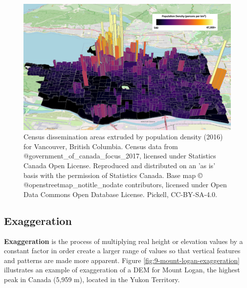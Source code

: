 \documentclass[
]{book}
\begin{document}
\begin{figure}
\includegraphics[width=0.75\linewidth]{images/09-vancouver-population-density-2016} \caption{Census dissemination areas extruded by population density (2016) for Vancouver, British Columbia. Census data from @government_of_canada_focus_2017, licensed under Statistics Canada Open License. Reproduced and distributed on an 'as is' basis with the permission of Statistics Canada. Base map © @openstreetmap_notitle_nodate contributors, licensed under Open Data Commons Open Database License. Pickell, CC-BY-SA-4.0.}\label{fig:9-vancouver-population-density-2016}
\end{figure}

\hypertarget{exaggeration}{%
\subsection{Exaggeration}\label{exaggeration}}

\textbf{Exaggeration} is the process of multiplying real height or elevation values by a constant factor in order create a larger range of values so that vertical features and patterns are made more apparent. Figure \ref{fig:9-mount-logan-exaggeration} illustrates an example of exaggeration of a DEM for Mount Logan, the highest peak in Canada (5,959 m), located in the Yukon Territory.
\end{document}
